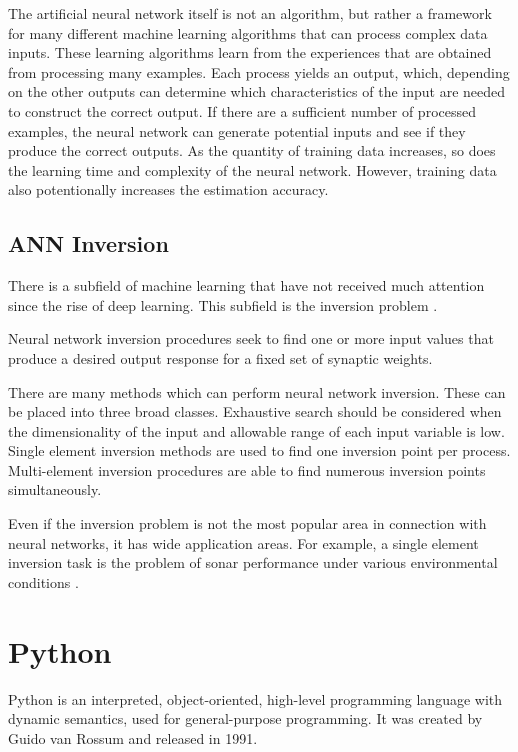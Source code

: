 The artificial neural network itself is not an algorithm, but rather a framework for many different machine learning algorithms that can process complex data inputs. These learning algorithms learn from the experiences that are obtained from processing many examples. Each process yields an output, which, depending on the other outputs can determine which characteristics of the input are needed to construct the correct output. If there are a sufficient number of processed examples, the neural network can generate potential inputs and see if they produce the correct outputs. As the quantity of training data increases, so does the learning time and complexity of the neural network. However, training data also potentionally increases the estimation accuracy.



\subsection{ANN Inversion}

There is a subfield of machine learning that have not received much attention since the rise of deep learning. This subfield is the inversion problem \cite{KINDERMANN1990277}. \smallskip

\label{para:inversion}Neural network inversion procedures seek to find one or more input values that produce a desired output response for a fixed set of synaptic weights. \medskip

There are many methods which can perform neural network inversion. These can be placed into three broad classes. Exhaustive search should be considered when the dimensionality of the input and allowable range of each input variable is low. Single element inversion methods are used to find one inversion point per process. Multi-element inversion procedures are able to find numerous inversion points simultaneously. \medskip

Even if the inversion problem is not the most popular area in connection with neural networks, it has wide application areas. For example, a single element inversion task is the problem of sonar performance under various environmental conditions \cite{article}. 



\section{Python}

Python \cite{van2011introduction}\cite{vanderplas2016python} is an interpreted, object-oriented, high-level programming language with dynamic semantics, used for general-purpose programming. It was created by Guido van Rossum and released in 1991. \medskip

